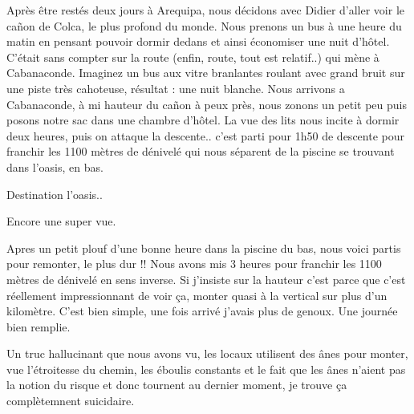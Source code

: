 \begin{multicols}{2}

Après être restés deux jours à Arequipa, nous décidons avec Didier d'aller voir le cañon de Colca, le plus profond du monde. Nous prenons un bus à une heure du matin en pensant pouvoir dormir dedans et ainsi économiser une nuit d'hôtel. C'était sans compter sur la route (enfin, route, tout est relatif..) qui mène à Cabanaconde. Imaginez un bus aux vitre branlantes roulant avec grand bruit sur une piste très cahoteuse, résultat : une nuit blanche. Nous arrivons a Cabanaconde, à mi hauteur du cañon à peux près, nous zonons un petit peu puis posons notre sac dans une chambre d'hôtel. La vue des lits nous incite à dormir deux heures, puis on attaque la descente.. c'est parti pour 1h50 de descente pour franchir les 1100 mètres de dénivelé qui nous séparent de la piscine se trouvant dans l'oasis, en bas.


Destination l'oasis..


Encore une super vue.


Apres un petit plouf d'une bonne heure dans la piscine du bas, nous voici partis pour remonter, le plus dur !! Nous avons mis 3 heures pour franchir les 1100 mètres de dénivelé en sens inverse. Si j'insiste sur la hauteur c'est parce que c'est réellement impressionnant de voir ça, monter quasi à la vertical sur plus d'un kilomètre. C'est bien simple, une fois arrivé j'avais plus de genoux. Une journée bien remplie.

Un truc hallucinant que nous avons vu, les locaux utilisent des ânes pour monter, vue l'étroitesse du chemin, les éboulis constants et le fait que les ânes n'aient pas la notion du risque et donc tournent au dernier moment, je trouve ça complètemnent suicidaire.


\end{multicols}

